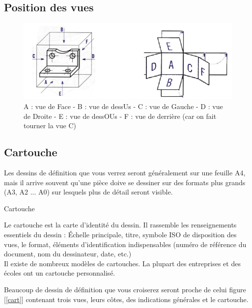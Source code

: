 \documentclass[
	11pt, %
	fleqn, %
	a4paper, %
]{LegrandOrangeBook}
\begin{document}
\subsection{Position des vues}
\begin{figure}[H] %
	\centering %
	\includegraphics[width=1\textwidth]{Images/pos1.png} %
	\caption{A : vue de Face - B : vue de dessUs - C : vue de Gauche - D : vue de Droite - E : vue de dessOUs - F : vue de derrière (car on fait tourner la vue C)}
	\label{pos1} %
\end{figure}

\subsection{Cartouche}
Les dessins de définition que vous verrez seront généralement sur une feuille A4, mais il arrive souvent qu'une pièce doive se dessiner sur des formats plus grands (A3, A2 ... A0) sur lesquels plus de détail seront visible. \\

\begin{definition}{Cartouche}


Le cartouche est la carte d’identité du dessin. Il rassemble les renseignements essentiels du dessin : Échelle principale, titre, symbole ISO de disposition des vues, le format, éléments d’identification indispensables (numéro de référence du document, nom du dessinateur, date, etc.)\\


Il existe de nombreux modèles de cartouches. La plupart des entreprises et des écoles ont un cartouche personnalisé.

\end{definition}

Beaucoup de dessin de définition que vous croiserez seront proche de celui figure [\ref{cart}] contenant trois vues, leurs côtes, des indications générales et le cartouche.
\end{document}
